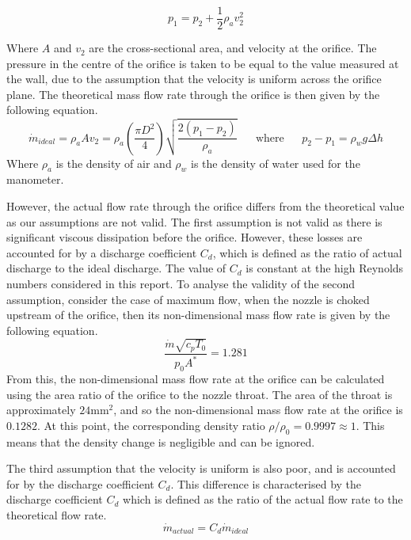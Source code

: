 \documentclass{article}
\begin{document}
\begin{equation}
    p_1 = p_2 + \frac{1}{2} \rho_a v_2^2
\end{equation}

Where $A$ and $v_2$ are the cross-sectional area, and velocity at the orifice. The pressure in the centre of the orifice is taken to be equal to the value measured at the wall, due to the assumption that the velocity is uniform across the orifice plane.
The theoretical mass flow rate through the orifice is then given by the following equation.
\begin{equation}
    \dot{m}_{ideal} = \rho_a A v_2 = \rho_a \left( \frac{\pi D^2}{4}\right) \sqrt{\frac{2(p_1-p_2)}{\rho_a}} \;\;\;\;\;\; \text{where} \;\;\;\;\;\ p_2 - p_1 = \rho_w g \Delta h
\end{equation}
Where $\rho_a$ is the density of air and $\rho_w$ is the density of water used for the manometer.

However, the actual flow rate through the orifice differs from the theoretical value as our assumptions are not valid.
The first assumption is not valid as there is significant viscous dissipation before the orifice. However, these losses are accounted for by a discharge coefficient $C_d$, which is defined as the ratio of actual discharge to the ideal discharge.
The value of $C_d$ is constant at the high Reynolds numbers considered in this report.
To analyse the validity of the second assumption, consider the case of maximum flow, when the nozzle is choked upstream of the orifice, then its non-dimensional mass flow rate is given by the following equation.
\begin{equation}
    \frac{\dot{m}\sqrt{c_pT_0}}{p_0A^*} = 1.281
\end{equation}
From this, the non-dimensional mass flow rate at the orifice can be calculated using the area ratio of the orifice to the nozzle throat.
The area of the throat is approximately $24\text{mm}^2$, and so the non-dimensional mass flow rate at the orifice is $0.1282$.
At this point, the corresponding density ratio $\rho/\rho_0 = 0.9997 \approx 1$. This means that the density change is negligible and can be ignored.

The third assumption that the velocity is uniform is also poor, and is accounted for by the discharge coefficient $C_d$.
This difference is characterised by the discharge coefficient $C_d$ which is defined as the ratio of the actual flow rate to the theoretical flow rate.
\begin{equation}
    \dot{m}_{actual} = C_d \dot{m}_{ideal}
\end{equation}
\end{document}
